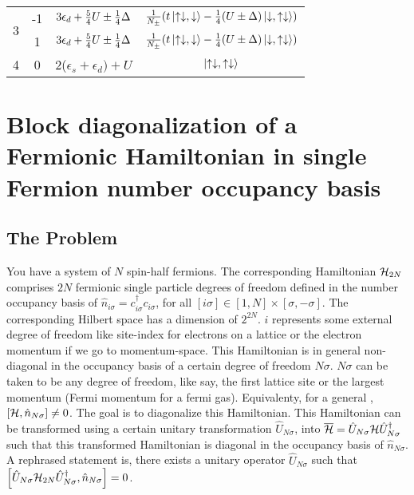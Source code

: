 \documentclass[12pt]{article}
\newcommand{\un}{\ensuremath{\hat{U}_{N\sigma}}}
\newcommand{\no}{\ensuremath{\hat{n}_{N\sigma}}}
\newcommand{\hml}{\ensuremath{\ham_{2N}}}
\begin{document}
\begin{center}
\begin{tabular}{@{}cccc@{}}
                                        \toprule

\multirow{2}{*}{3} & -1 & \(3\epsilon_d + \frac{5}{4}U \pm \frac{1}{4}\Delta\)  & \(\frac{1}{N_\pm}(t\ket{\uparrow\downarrow,\downarrow}-\frac{1}{4}(U\pm\Delta)\ket{\downarrow,\uparrow\downarrow})\) \\

 \cmidrule(l){2-4}

& 1 & \(3\epsilon_d + \frac{5}{4}U \pm \frac{1}{4}\Delta\)  & \(\frac{1}{N_\pm}(t\ket{\uparrow\downarrow,\downarrow}-\frac{1}{4}(U\pm\Delta)\ket{\downarrow,\uparrow\downarrow})\) \\
 \toprule

4                                      & 0                   & 2(\(\epsilon_s+\epsilon_d)+U\)  & \(\ket{\uparrow\downarrow,\uparrow\downarrow}\) \\
\toprule
\end{tabular}
\end{center}

\section{Block diagonalization of a Fermionic Hamiltonian in single Fermion number occupancy basis}
\subsection{The Problem} You have a system of \(N\) spin-half fermions. The corresponding Hamiltonian \(\hml\) comprises \(2N\) fermionic single particle degrees of freedom defined in the number occupancy basis of \(\hat{n}_{i\sigma} = c^\dagger_{i\sigma}c_{i\sigma}\), for all \([i\sigma]\in[1,N]\times[\sigma,-\sigma]\). The corresponding Hilbert space has a dimension of \(2^{2N}\). \(i\) represents some external degree of freedom like site-index for electrons on a lattice or the electron momentum if we go to momentum-space. This Hamiltonian is in general non-diagonal in the occupancy basis of a certain degree of freedom \(N\sigma\). \(N\sigma\) can be taken to be any degree of freedom, like say, the first lattice site or the largest momentum (Fermi momentum for a fermi gas). Equivalenty, for a general \ham, \(\left[{\mathcal{H}, \hat{n}_{N\sigma}}\right]\neq 0\). The goal is to diagonalize this Hamiltonian. 
\btm
This Hamiltonian can be transformed using a certain unitary transformation \un, into \(\overline{\ham} = \un \ham \un^\dagger\) such that this transformed Hamiltonian is diagonal in the occupancy basis of \(\hat{n}_{N\sigma}\). A rephrased statement is, there exists a unitary operator \(\un\) such that \(\qq{\un \hml \un^\dagger, \no}=0\).
\etm
\end{document}
